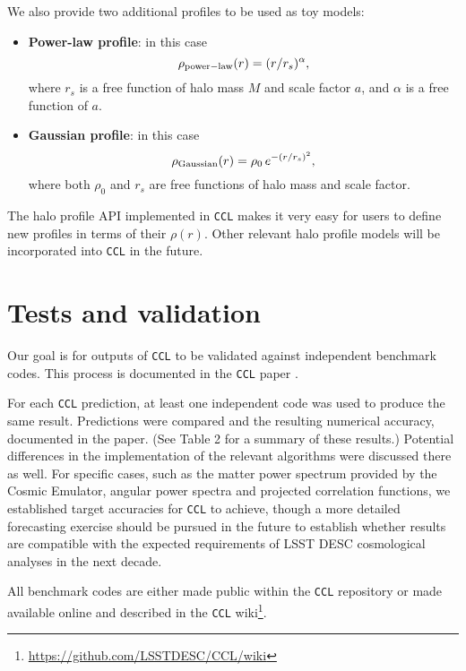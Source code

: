 \documentclass[\docopts]{\docclass}
\newcommand{\ccl}{{\tt CCL}\xspace}
\begin{document}
We also provide two additional profiles to be used as toy models:
\begin{itemize}
 \item {\bf Power-law profile}: in this case
 \begin{equation}
  \rho_{\rm power-law}(r) = (r/r_s)^\alpha,
 \end{equation}
 where $r_s$ is a free function of halo mass $M$ and scale factor $a$, and $\alpha$ is a free function of $a$.
 \item {\bf Gaussian profile}: in this case
   \begin{equation}
    \rho_{\rm Gaussian}(r) = \rho_0\, e^{-(r/r_s)^2},
   \end{equation}
   where both $\rho_0$ and $r_s$ are free functions of halo mass and scale factor.
\end{itemize}

The halo profile API implemented in \ccl makes it very easy for users to define new profiles in terms of their $\rho(r)$. Other relevant halo profile models will be incorporated into \ccl in the future.


\section{Tests and validation}
\label{sec:tests}

Our goal is for outputs of \ccl to be validated against independent benchmark codes.
This process is documented in the \ccl paper \citep{Chisari2019}.

For each \ccl prediction, at least one independent code was used to produce the same
result. Predictions were compared and the resulting numerical accuracy, documented
in the paper. (See Table 2 for a summary of these results.) Potential differences
in the implementation of the relevant algorithms were discussed there as well.
For specific cases, such as the matter power spectrum provided by the Cosmic Emulator,
angular power spectra and projected correlation functions, we established target
accuracies for \ccl to achieve, though a more detailed forecasting exercise should be
pursued in the future to establish whether results are compatible with the expected
requirements of LSST DESC cosmological analyses in the next decade.

All benchmark codes are either made public within the \ccl repository or made available
online and described in the \ccl wiki\footnote{\url{https://github.com/LSSTDESC/CCL/wiki}}.







\end{document}
